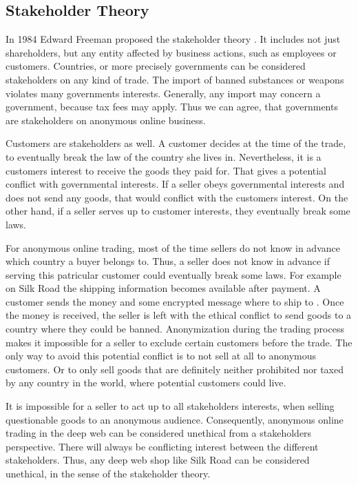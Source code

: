 \subsection{Stakeholder Theory}

In 1984 Edward Freeman proposed the stakeholder theory \cite{stakeholder}. It includes not just shareholders, but any entity affected by business actions, such as employees or customers. Countries, or more precisely governments can be considered stakeholders on any kind of trade. The import of banned substances or weapons violates many governments interests. Generally, any import may concern a government, because tax fees may apply. Thus we can agree, that governments are stakeholders on anonymous online business.

Customers are stakeholders as well. A customer decides at the time of the trade, to eventually break the law of the country she lives in. Nevertheless, it is a customers interest to receive the goods they paid for. That gives a potential conflict with governmental interests. If a seller obeys governmental interests and does not send any goods, that would conflict with the customers interest. On the other hand, if a seller serves up to customer interests, they eventually break some laws.

For anonymous online trading, most of the time sellers do not know in advance which country a buyer belongs to. Thus, a seller does not know in advance if serving this patricular customer could eventually break some laws. For example on Silk Road the shipping information becomes available after payment. A customer sends the money and some encrypted message where to ship to \cite{silkroad2013}. Once the money is received, the seller is left with the ethical conflict to send goods to a country where they could be banned. Anonymization during the trading process makes it impossible for a seller to exclude certain customers before the trade. The only way to avoid this potential conflict is to not sell at all to anonymous customers. Or to only sell goods that are definitely neither prohibited nor taxed by any country in the world, where potential customers could live.

It is impossible for a seller to act up to all stakeholders interests, when selling questionable goods to an anonymous audience. Consequently, anonymous online trading in the deep web can be considered unethical from a stakeholders perspective. There will always be conflicting interest between the different stakeholders. Thus, any deep web shop like Silk Road can be considered unethical, in the sense of the stakeholder theory.
